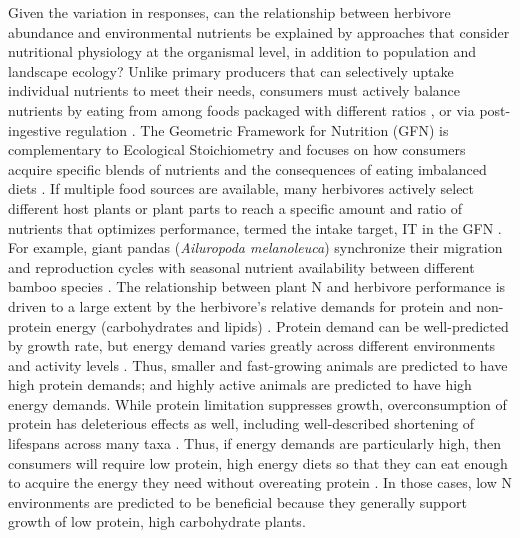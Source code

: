 \documentclass[
]{article}
\begin{document}
Given the variation in responses, can the relationship between herbivore
abundance and environmental nutrients be explained by approaches that
consider nutritional physiology at the organismal level, in addition to
population and landscape ecology? Unlike primary producers that can
selectively uptake individual nutrients to meet their needs, consumers
must actively balance nutrients by eating from among foods packaged with
different ratios \citep{raubenheimer_geometry_1993}, or via
post-ingestive regulation \citep{zanotto_regulation_1993}. The Geometric
Framework for Nutrition (GFN) is complementary to Ecological
Stoichiometry and focuses on how consumers acquire specific blends of
nutrients and the consequences of eating imbalanced diets
\citep{simpson_nature_2012}. If multiple food sources are available,
many herbivores actively select different host plants or plant parts to
reach a specific amount and ratio of nutrients that optimizes
performance, termed the intake target, IT in the GFN
\citep{simpson_nature_2012}. For example, giant pandas (\emph{Ailuropoda
melanoleuca}) synchronize their migration and reproduction cycles with
seasonal nutrient availability between different bamboo species
\citep{nie_obligate_2015}. The relationship between plant N and
herbivore performance is driven to a large extent by the herbivore's
relative demands for protein and non-protein energy (carbohydrates and
lipids) \citep{behmer_insect_2009}. Protein demand can be well-predicted
by growth rate, but energy demand varies greatly across different
environments and activity levels \citep{talal_body_2024}. Thus, smaller
and fast-growing animals are predicted to have high protein demands; and
highly active animals are predicted to have high energy demands. While
protein limitation suppresses growth, overconsumption of protein has
deleterious effects as well, including well-described shortening of
lifespans across many taxa
\citep{lecouteur_impact_2015, moatt_lifespan_2020}. Thus, if energy
demands are particularly high, then consumers will require low protein,
high energy diets so that they can eat enough to acquire the energy they
need without overeating protein \citep{raubenheimer_integrating_1999}.
In those cases, low N environments are predicted to be beneficial
because they generally support growth of low protein, high carbohydrate
plants.
\end{document}
